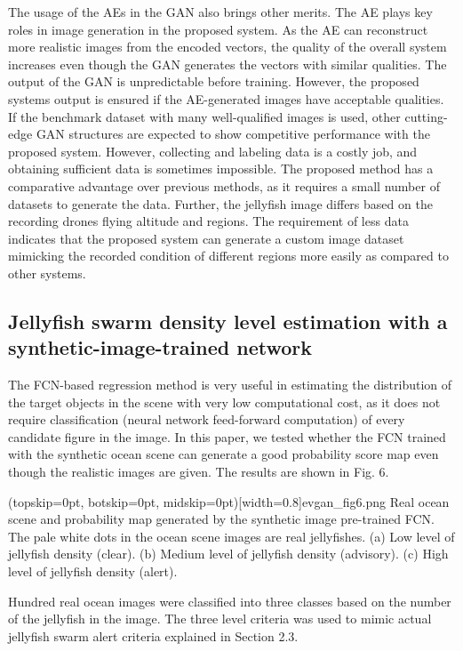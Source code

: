 \documentclass{ieeeaccess}
\begin{document}
The usage of the AEs in the GAN also brings other merits. The AE plays key roles in image generation in the proposed system. As the AE can reconstruct more realistic images from the encoded vectors, the quality of the overall system increases even though the GAN generates the vectors with similar qualities. The output of the GAN is unpredictable before training. However, the proposed system\textquotesingle s output is ensured if the AE-generated images have acceptable qualities.
If the benchmark dataset with many well-qualified images is used, other cutting-edge GAN structures are expected to show competitive performance with the proposed system. However, collecting and labeling data is a costly job, and obtaining sufficient data is sometimes impossible. The proposed method has a comparative advantage over previous methods, as it requires a small number of datasets to generate the data. Further, the jellyfish image differs based on the recording drone\textquotesingle s flying altitude and regions. The requirement of less data indicates that the proposed system can generate a custom image dataset mimicking the recorded condition of different regions more easily as compared to other systems.


\subsection{Jellyfish swarm density level estimation with a synthetic-image-trained network}

The FCN-based regression method is very useful in estimating the distribution of the target objects in the scene with very low computational cost, as it does not require classification (neural network feed-forward computation) of every candidate figure in the image. In this paper, we tested whether the FCN trained with the synthetic ocean scene can generate a good probability score map even though the realistic images are given. The results are shown in Fig. 6.

\Figure[!t](topskip=0pt, botskip=0pt, midskip=0pt)[width=0.8\linewidth]{evgan_fig6.png}
{Real ocean scene and probability map generated by the synthetic image pre-trained FCN. The pale white dots in the ocean scene images are real jellyfishes. (a) Low level of jellyfish density (clear). (b) Medium level of jellyfish density (advisory). (c) High level of jellyfish density (alert).\label{fig6}}

Hundred real ocean images were classified into three classes based on the number of the jellyfish in the image. The three level criteria was used to mimic actual jellyfish swarm alert criteria explained in Section 2.3.
\end{document}
